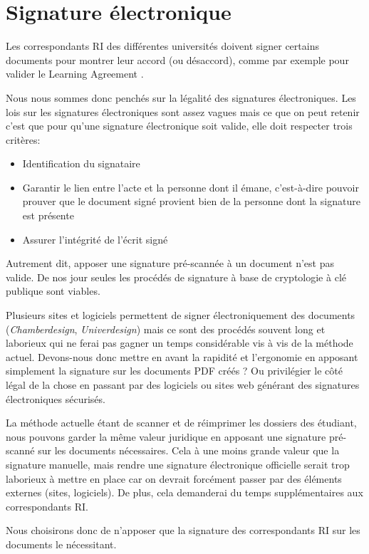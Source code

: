 \section{Signature électronique}
Les correspondants RI des différentes universités doivent signer certains documents pour montrer leur accord (ou désaccord), comme par exemple pour valider le \og Learning Agreement \fg{}.

Nous nous sommes donc penchés sur la légalité des signatures électroniques.
Les lois sur les signatures électroniques sont assez vagues mais ce que on peut retenir c'est que pour qu'une signature électronique soit valide, elle doit respecter trois critères:
\begin{itemize}
\item Identification du signataire
\item Garantir le lien entre l'acte et la personne dont il émane, c'est-à-dire pouvoir prouver que le document signé provient bien de la personne dont la signature est présente
\item Assurer l'intégrité de l'écrit signé
\end{itemize}
Autrement dit, apposer une signature pré-scannée à un document n'est pas valide.
De nos jour seules les procédés de signature à base de cryptologie à clé publique sont viables.

Plusieurs sites et logiciels permettent de signer électroniquement des documents (\textit{Chamberdesign}, \textit{Univerdesign}) mais ce sont des procédés souvent long et laborieux qui ne ferai pas gagner un temps considérable vis à vis de la méthode actuel.
Devons-nous donc mettre en avant la rapidité et l'ergonomie en apposant simplement la signature sur les documents PDF créés ? Ou privilégier le côté légal de la chose en passant par des logiciels ou sites web générant des signatures électroniques sécurisés.

La méthode actuelle étant de scanner et de réimprimer les dossiers des étudiant, nous pouvons garder la même valeur juridique en apposant une signature pré-scanné sur les documents nécessaires. Cela à une moins grande valeur que la signature manuelle, mais rendre une signature électronique officielle serait trop laborieux à mettre en place car on devrait forcément passer par des éléments externes (sites, logiciels). De plus, cela demanderai du temps supplémentaires aux correspondants RI.

Nous choisirons donc de n'apposer que la signature des correspondants RI sur les documents le nécessitant.
